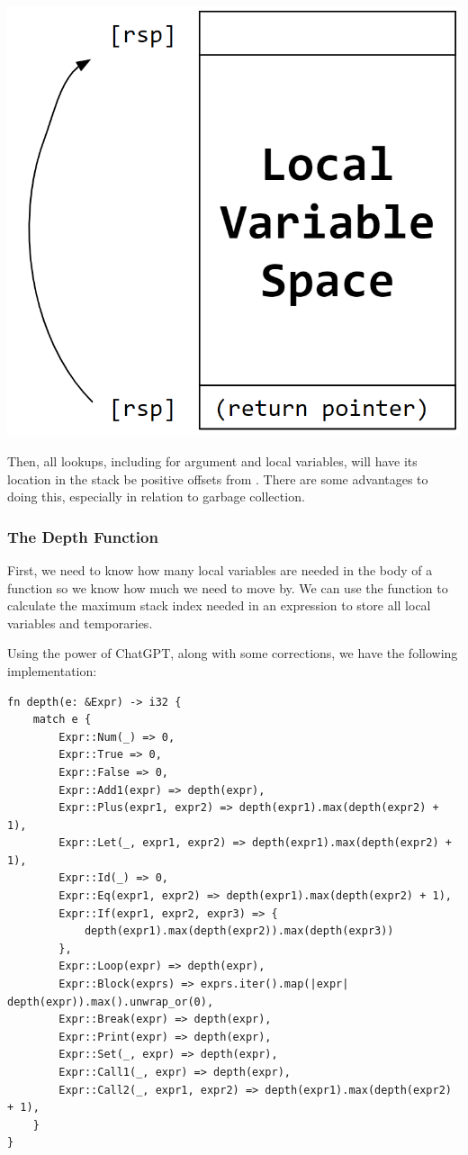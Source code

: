 \begin{center}
    \includegraphics[scale=0.3]{assets/callee_stack_mnged.png}
\end{center}
Then, all lookups, including for argument and local variables, will have its location in the stack be positive offsets from . There are some advantages to doing this, especially in relation to garbage collection.

\subsubsection{The Depth Function}
First, we need to know how many local variables are needed in the body of a function so we know how much we need to move  by. We can use the  function to calculate the maximum stack index needed in an expression to store all local variables and temporaries. 

\bigskip 

Using the power of ChatGPT, along with some corrections, we have the following implementation:
\begin{verbatim}
fn depth(e: &Expr) -> i32 {
    match e {
        Expr::Num(_) => 0,
        Expr::True => 0,
        Expr::False => 0,
        Expr::Add1(expr) => depth(expr),
        Expr::Plus(expr1, expr2) => depth(expr1).max(depth(expr2) + 1),
        Expr::Let(_, expr1, expr2) => depth(expr1).max(depth(expr2) + 1),
        Expr::Id(_) => 0,
        Expr::Eq(expr1, expr2) => depth(expr1).max(depth(expr2) + 1),
        Expr::If(expr1, expr2, expr3) => {
            depth(expr1).max(depth(expr2)).max(depth(expr3))
        },
        Expr::Loop(expr) => depth(expr),
        Expr::Block(exprs) => exprs.iter().map(|expr| depth(expr)).max().unwrap_or(0),
        Expr::Break(expr) => depth(expr),
        Expr::Print(expr) => depth(expr),
        Expr::Set(_, expr) => depth(expr),
        Expr::Call1(_, expr) => depth(expr),
        Expr::Call2(_, expr1, expr2) => depth(expr1).max(depth(expr2) + 1),
    }
}\end{verbatim}

